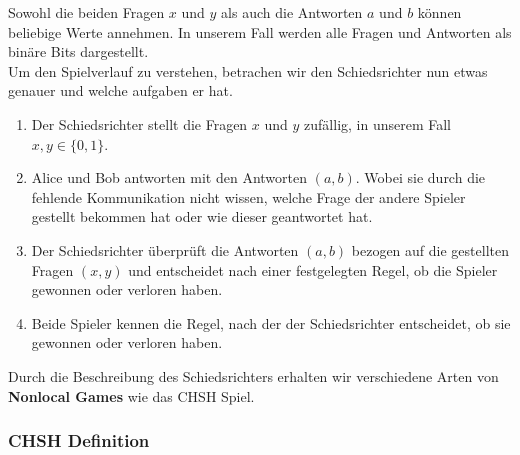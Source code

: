 Sowohl die beiden Fragen $x$ und $y$ als auch die Antworten $a$ und $b$ können beliebige Werte annehmen. In unserem Fall werden alle Fragen und Antworten als binäre Bits dargestellt.\\

Um den Spielverlauf zu verstehen, betrachen wir den Schiedsrichter nun etwas genauer und welche aufgaben er hat.
\begin{enumerate}
    \item Der Schiedsrichter stellt die Fragen $x$ und $y$ zufällig, in unserem Fall $x, y \in \{0, 1\}$.
    \item Alice und Bob antworten mit den Antworten $(a, b)$. Wobei sie durch die fehlende Kommunikation nicht wissen, welche Frage der andere Spieler gestellt bekommen hat oder wie dieser geantwortet hat.
    \item Der Schiedsrichter überprüft die Antworten $(a, b)$ bezogen auf die gestellten Fragen $(x, y)$ und entscheidet nach einer festgelegten Regel, ob die Spieler gewonnen oder verloren haben.
    \item Beide Spieler kennen die Regel, nach der der Schiedsrichter entscheidet, ob sie gewonnen oder verloren haben.
\end{enumerate}

Durch die Beschreibung des Schiedsrichters erhalten wir verschiedene Arten von \textbf{Nonlocal Games} wie das CHSH Spiel.\\

\subsubsection{CHSH Definition}
\label{subsubsec:chsh_definition}

